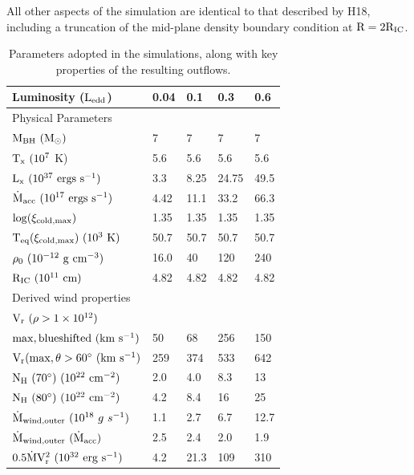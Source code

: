 \documentclass[a4paper,fleqn,usenatbib]{mnras}
\begin{document}
All other aspects of the simulation are identical to that described by H18, including a truncation of the 
mid-plane density boundary condition at $\rm{R=2 R_{IC}}$.

\begin{table}
\begin{tabular}{p{3.0cm}p{0.8cm}p{0.8cm}p{0.8cm}p{0.8cm}}
\hline 
Luminosity ($\rm{L_{edd}}$) & 0.04 & 0.1 & 0.3 & 0.6 \\ 
\hline 
\hline Physical Parameters & & & \\ \hline
$\rm{M_{BH}~(M_{\odot})}$  & 7 & 7 & 7 &7\\
$\rm{T_x~(10^7~}$K)  & 5.6 & 5.6 & 5.6  & 5.6\\
$\rm{L_x~(10^{37}}~\rm{ergs~s^{-1}})$&  3.3& 8.25 &  24.75 &49.5\\
$\rm{\dot{M}_{acc}~(10^{17}}~\rm{ergs~s^{-1}})$&  4.42 & 11.1 &  33.2 &66.3\\
$\rm{\log(\xi_{cold,max})}$&   1.35 & 1.35 & 1.35 & 1.35 \\
$\rm{T_{eq}(\xi_{cold,max})~(10^3~K)}$ &  50.7 &  50.7 & 50.7 & 50.7 \\
$\rm{\rho_0~(10^{-12}~g~cm^{-3})}$  & 16.0 & 40 & 120 & 240 \\
$\rm{R_{IC}~(10^{11}~cm)}$  & 4.82 & 4.82 & 4.82 & 4.82 \\
\hline
\multicolumn{4}{l}{Derived wind properties}\\
\hline 
\multicolumn{4}{l}{$\rm{V_r~(\rho>1\times10^{12})}$}  \\
$\rm{max,blueshifted~({km~s^{-1}})}$ &  50 & 68 & 256  & 150  \\
$\rm{V_r(max,\theta>60\degree~({km~s^{-1}})}$ &  259   & 374 & 533    & 642 \\
$\rm{N_H~(70\degree)~(10^{22}}~\rm{cm^{-2})}$ & 2.0 & 4.0 &  8.3 & 13 \\
$\rm{N_H~(80\degree)~(10^{22}}~\rm{cm^{-2})}$  & 4.2 & 8.4 & 16 & 25 \\
${\dot{\rm{M}}_{\rm{wind,outer}}~(10^{18}~g~s^{-1}})$  &  1.1 & 2.7 &  6.7  & 12.7 \\
${\dot{\rm{M}}_{\rm{wind,outer}}~(\dot{\rm{M}}_{\rm{acc}})}$  & 2.5 & 2.4 & 2.0 & 1.9  \\
${0.5\dot{\rm{M}}\rm{V_r^2}~(10^{32}}~\rm{erg~s^{-1}})$  &  4.2 & 21.3 &   109 & 310  \\


\hline
\end{tabular}
\caption{Parameters adopted in the simulations, along with key properties of the resulting outflows.}
\label{table:wind_param}
\end{table}
\end{document}
